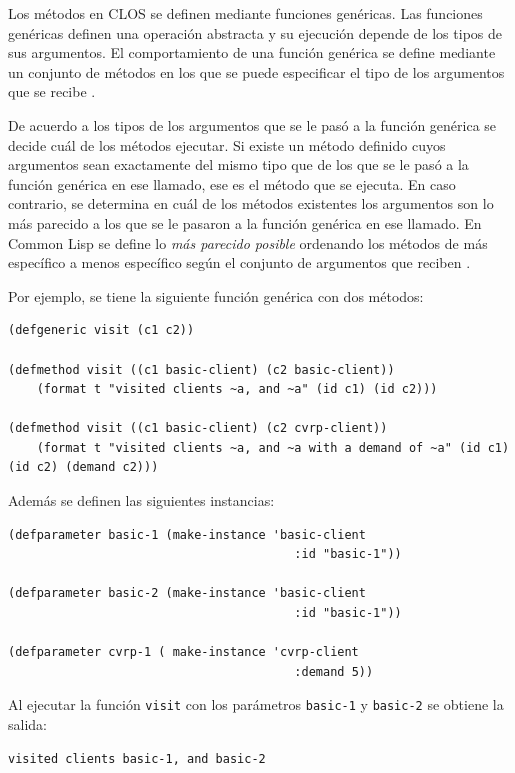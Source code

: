 Los métodos en CLOS se definen mediante funciones genéricas. Las funciones genéricas definen una operación abstracta y su ejecución depende de los tipos de sus argumentos. El comportamiento de una función genérica se define mediante un conjunto de métodos en los que se puede especificar el tipo de los argumentos que se recibe \cite{CLOS}.

De acuerdo a los tipos de los argumentos que se le pasó a la función genérica se decide cuál de los métodos ejecutar. Si existe un método definido cuyos argumentos sean exactamente del mismo tipo que de los que se le pasó a la función genérica en ese llamado, ese es el método que se ejecuta. En caso contrario, se determina en cuál de los métodos existentes los argumentos son lo más parecido a los que se le pasaron a la función genérica en ese llamado. En Common Lisp se define lo \textit{más parecido posible} ordenando los métodos de más específico a menos específico según el conjunto de argumentos que reciben \cite{CLOS}.

Por ejemplo, se tiene la siguiente función genérica con dos métodos:

\begin{lstlisting}
(defgeneric visit (c1 c2))

(defmethod visit ((c1 basic-client) (c2 basic-client))
	(format t "visited clients ~a, and ~a" (id c1) (id c2)))

(defmethod visit ((c1 basic-client) (c2 cvrp-client))
	(format t "visited clients ~a, and ~a with a demand of ~a" (id c1) (id c2) (demand c2)))

\end{lstlisting}

Además se definen las siguientes instancias:

\begin{lstlisting}
(defparameter basic-1 (make-instance 'basic-client
										:id "basic-1"))

(defparameter basic-2 (make-instance 'basic-client
										:id "basic-1"))
	
(defparameter cvrp-1 ( make-instance 'cvrp-client
										:demand 5))
\end{lstlisting}

Al ejecutar la función \texttt{visit} con los parámetros \texttt{basic-1} y \texttt{basic-2} se obtiene la salida:

\begin{lstlisting}
visited clients basic-1, and basic-2
\end{lstlisting}

